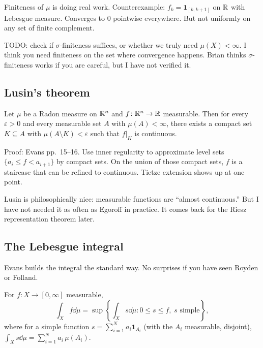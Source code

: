 Finiteness of $\mu$ is doing real work. Counterexample:
$f_k = \mathbf{1}_{[k, k+1]}$ on $\mathbb{R}$ with Lebesgue measure. Converges
to $0$ pointwise everywhere. But not uniformly on any set of finite
complement.

TODO: check if $\sigma$-finiteness suffices, or whether we truly need
$\mu(X) < \infty$. I think you need finiteness on the set where convergence
happens. Brian thinks $\sigma$-finiteness works if you are careful, but I have not verified it.


\subsection{Lusin's theorem}\label{subsec:lusin}

\begin{theorem}[Lusin]\label{thm:lusin}
Let $\mu$ be a Radon measure on $\mathbb{R}^n$ and $f \colon \mathbb{R}^n \to \mathbb{R}$
measurable. Then for every $\varepsilon > 0$ and every measurable set $A$
with $\mu(A) < \infty$, there exists a compact set $K \subseteq A$ with
$\mu(A \setminus K) < \varepsilon$ such that $f|_K$ is continuous.
\end{theorem}

Proof: Evans pp.\ 15--16. Use inner regularity to
approximate level sets $\{a_i \le f < a_{i+1}\}$ by compact sets. On the
union of those compact sets, $f$ is a staircase that can be refined to
continuous. Tietze extension shows up at one point.

Lusin is philosophically nice: measurable functions are ``almost
continuous.'' But I have not needed it as often as Egoroff in practice.
It comes back for the Riesz representation theorem later.


\subsection{The Lebesgue integral}\label{subsec:integral}

Evans builds the integral the standard way. No surprises if you have seen Royden or Folland.

\begin{definition}\label{def:integral}
For $f \colon X \to [0, \infty]$ measurable,
\[
  \int_X f \dd\mu = \sup\left\{ \int_X s \dd\mu :
    0 \le s \le f,\; s \text{ simple} \right\},
\]
where for a simple function $s = \sum_{i=1}^N a_i \mathbf{1}_{A_i}$
(with the $A_i$ measurable, disjoint),
$\int_X s \dd\mu = \sum_{i=1}^N a_i \,\mu(A_i)$.
\end{definition}

